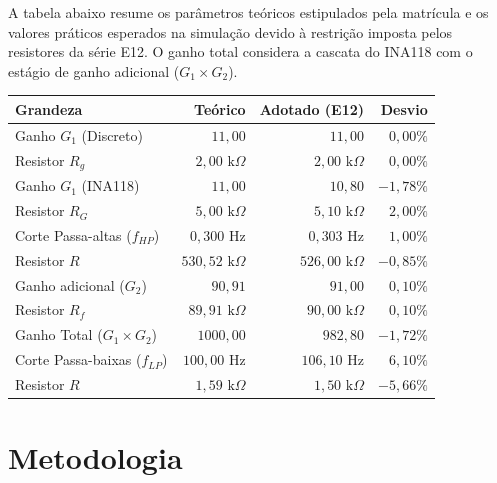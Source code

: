 \documentclass[11pt,a4paper]{article}
\begin{document}
A tabela abaixo resume os parâmetros teóricos estipulados pela matrícula e os valores práticos esperados na simulação devido à restrição imposta pelos resistores da série E12. O ganho total considera a cascata do INA118 com o estágio de ganho adicional ($G_1 \times G_2$).

\begin{center}
\renewcommand{\arraystretch}{1.2}
\begin{tabular}{@{}lrrr@{}}
\toprule
\textbf{Grandeza} & \textbf{Teórico} & \textbf{Adotado (E12)} & \textbf{Desvio} \\
\midrule
Ganho $G_1$ (Discreto) & $11{,}00$ & $11{,}00$ & $0{,}00\%$ \\
Resistor $R_g$ & $2{,}00\text{ k}\Omega$ & $2{,}00\text{ k}\Omega$ & $0{,}00\%$ \\
Ganho $G_1$ (INA118) & $11{,}00$ & $10{,}80$ & $-1{,}78\%$ \\
Resistor $R_G$ & $5{,}00\text{ k}\Omega$ & $5{,}10\text{ k}\Omega$ & $2{,}00\%$ \\
Corte Passa-altas ($f_{HP}$) & $0{,}300\text{ Hz}$ & $0{,}303\text{ Hz}$ & $1{,}00\%$ \\
Resistor $R$ & $530{,}52\text{ k}\Omega$ & $526{,}00\text{ k}\Omega$ & $-0{,}85\%$ \\
Ganho adicional ($G_2$) & $90{,}91$ & $91{,}00$ & $0{,}10\%$ \\
Resistor $R_f$ & $89{,}91\text{ k}\Omega$ & $90{,}00\text{ k}\Omega$ & $0{,}10\%$ \\
Ganho Total ($G_1 \times G_2$) & $1000{,}00$ & $982{,}80$ & $-1{,}72\%$ \\
Corte Passa-baixas ($f_{LP}$) & $100{,}00\text{ Hz}$ & $106{,}10\text{ Hz}$ & $6{,}10\%$ \\
Resistor $R$ & $1{,}59\text{ k}\Omega$ & $1{,}50\text{ k}\Omega$ & $-5{,}66\%$ \\
\bottomrule
\end{tabular}
\end{center}


\section{Metodologia}

\end{document}
